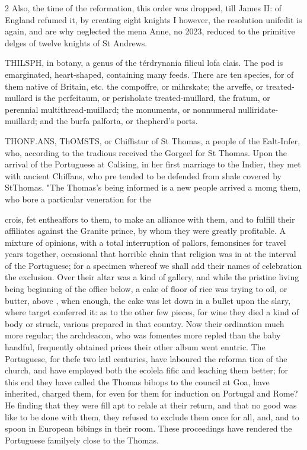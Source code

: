 \documentclass[10pt]{article}
\begin{document}
\begin{multicols}{2}
Also, the time of the reformation, this order was dropped, till James II: of England refumed it, by creating eight knights I however, the resolution unifedit is again, and are why neglected the mena Anne, no 2023, reduced to the primitive delges of twelve knights of St Andrews.

THILSPH, in botany, a genus of the térdrynania filicul lofa clais. The pod is emarginated, heart-shaped, containing many feeds. There are ten species, for of them native of Britain, etc. the compoffre, or mihrskate; the arveffe, or treated-mullard is the perfeitaum, or perisholate treated-muillard, the fratum, or perennial multithread-muillard; the monuments, or nonnumeral nulliridate-muillard; and the burfa palforta, or thepherd's ports.

THONF.ANS, ThOMSTS, or Chiffistur of St Thomas, a people of the Ealt-Infer, who, according to the tradious received the Gorgeel for St Thomas. Upon the arrival of the Portuguese at Calising, in her first marriage to the Indier, they met with ancient Chiffans, who pre tended to be defended from shale covered by StThomas. "The Thomas’s being informed is a new people arrived a momg them, who bore a particular veneration for the

crois, fet entheaffors to them, to make an alliance with them, and to fulfill their affiliates against the Granite prince, by whom they were greatly profitable. A mixture of opinions, with a total interruption of pallors, femonsines for travel years together, occasional that horrible chain that religion was in at the interval of the Portuguese; for a specimen whereof we shall add their names of celebration the exclusion. Over their altar was a kind of gallery, and while the pristine living being beginning of the office below, a cake of floor of rice was trying to oil, or butter, above , when enough, the cake was let down in a bullet upon the slary, where target conferred it: as to the other few pieces, for wine they died a kind of body or struck, various prepared in that country. Now their ordination much more regular; the archdeacon, who was fomentes more repled than the baby handful, frequently obtained prices their other album went enntric. The Portuguese, for thefe two latl centuries, have laboured the reforma tion of the church, and have employed both the ecolela fific and leaching them better; for this end they have called the Thomas bibops to the council at Goa, have inherited, charged them, for even for them for induction on Portugal and Rome? He finding that they were fill apt to relale at their return, and that no good was like to be done with them, they refused to exclude them once for all, and, and to spoon in European bibings in their room. These proceedings have rendered the Portuguese familyely close to the Thomas.


\end{multicols}
\end{document}
